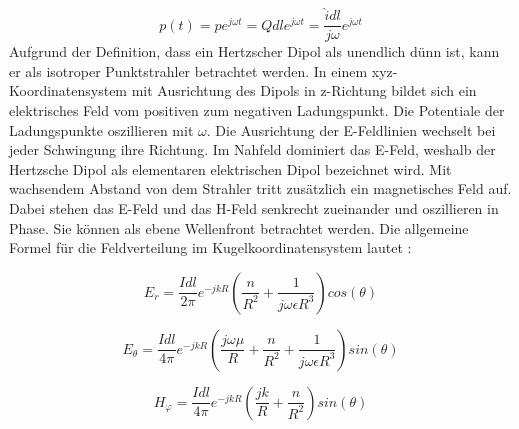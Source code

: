 \begin{equation}\label{Dipolmoment}
p(t)=pe^{j\omega t} = Q dl e^{j\omega t} = \frac{\hat{i} dl}{j\omega }e^{j\omega t}
\end{equation}
Aufgrund der Definition, dass ein Hertzscher Dipol als unendlich dünn ist, kann er als isotroper Punktstrahler betrachtet werden. In einem xyz-Koordinatensystem mit Ausrichtung des Dipols in z-Richtung bildet sich ein elektrisches Feld vom positiven zum negativen Ladungspunkt. Die Potentiale der Ladungspunkte oszillieren mit $\omega$. Die Ausrichtung der E-Feldlinien wechselt bei jeder Schwingung ihre Richtung. Im Nahfeld dominiert das E-Feld, weshalb der Hertzsche Dipol als elementaren elektrischen Dipol bezeichnet wird. Mit wachsendem Abstand von dem Strahler tritt zusätzlich ein magnetisches Feld auf. Dabei stehen das E-Feld und das H-Feld senkrecht zueinander und oszillieren in Phase. Sie können als ebene Wellenfront betrachtet werden. Die allgemeine Formel für die Feldverteilung im Kugelkoordinatensystem lautet \cite{elliott1981antenna}:







\begin{equation}
E_r= \frac{I dl}{2\pi}   e^{-jkR} \left( \frac{n}{R^{2}}  + \frac{1}{j\omega \epsilon R^{3}}\right) cos(\theta)
\end{equation}

\begin{equation}
E_\theta= \frac{I dl}{4\pi}   e^{-jkR} \left( \frac{j\omega \mu}{R}  + \frac{n}{R^{2}}+ \frac{1}{j\omega \epsilon R^{3}}\right) sin(\theta)
\end{equation}

\begin{equation}
H_\varphi= \frac{I dl}{4\pi}   e^{-jkR} \left( \frac{jk}{R}  + \frac{n}{R^{2}}\right) sin(\theta)
\end{equation}

